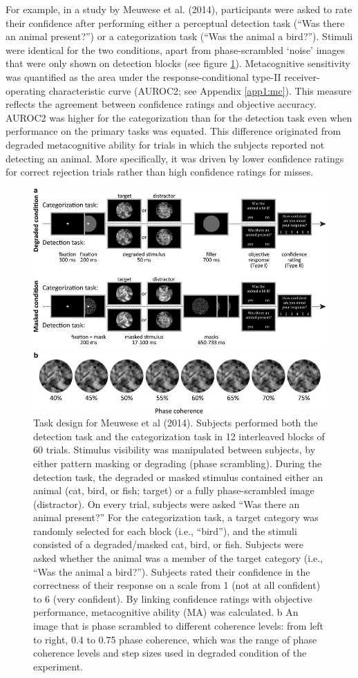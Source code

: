 \documentclass[12pt,twoside]{reedthesis}
\begin{document}
For example, in a study by Meuwese et al. (2014), participants were asked to rate their confidence after performing either a perceptual detection task (``Was there an animal present?'') or a categorization task (``Was the animal a bird?''). Stimuli were identical for the two conditions, apart from phase-scrambled `noise' images that were only shown on detection blocks (see figure \ref{fig:intro-meuwese}). Metacognitive sensitivity was quantified as the area under the response-conditional type-II receiver-operating characteristic curve (AUROC2; see Appendix \ref{app1:mc}). This measure reflects the agreement between confidence ratings and objective accuracy. AUROC2 was higher for the categorization than for the detection task even when performance on the primary tasks was equated. This difference originated from degraded metacognitive ability for trials in which the subjects reported not detecting an animal. More specifically, it was driven by lower confidence ratings for correct rejection trials rather than high confidence ratings for misses.
\begin{figure}
\includegraphics[width=0.7\linewidth]{figure/intro/Meuwese} \caption[Task design for Meuwese et al (2014).]{Task design for Meuwese et al (2014). Subjects performed both the detection task and the categorization task in 12 interleaved blocks of 60 trials. Stimulus visibility was manipulated between subjects, by either pattern masking or degrading (phase scrambling). During the detection task, the degraded or masked stimulus contained either an animal (cat, bird, or fish; target) or a fully phase-scrambled image (distractor). On every trial, subjects were asked “Was there an animal present?” For the categorization task, a target category was randomly selected for each block (i.e., “bird”), and the stimuli consisted of a degraded/masked cat, bird, or fish. Subjects were asked whether the animal was a member of the target category (i.e., “Was the animal a bird?”). Subjects rated their confidence in the correctness of their response on a scale from 1 (not at all confident) to 6 (very confident). By linking confidence ratings with objective performance, metacognitive ability (MA) was calculated. b An image that is phase scrambled to different coherence levels: from left to right, 0.4 to 0.75  phase coherence, which was the range of phase coherence levels and step sizes used in degraded condition of the experiment.}\label{fig:intro-meuwese}
\end{figure}
\end{document}

